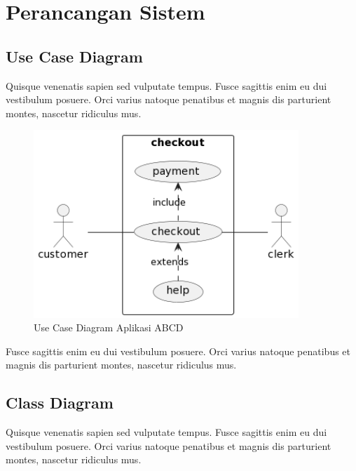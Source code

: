\section{Perancangan Sistem}

\subsection{Use Case Diagram}
Quisque venenatis sapien sed vulputate tempus. Fusce sagittis enim eu dui vestibulum posuere. Orci varius natoque penatibus et magnis dis parturient montes, nascetur ridiculus mus.
\begin{figure}[H]
    \centering
    \includegraphics[width=10cm]{assets/pics/dummy-use-case-diagram.png}
    \caption{Use Case Diagram Aplikasi ABCD}
    \label{fig:usecaseDiagram}
\end{figure}

Fusce sagittis enim eu dui vestibulum posuere. Orci varius natoque penatibus et magnis dis parturient montes, nascetur ridiculus mus.

\subsection{Class Diagram}
Quisque venenatis sapien sed vulputate tempus. Fusce sagittis enim eu dui vestibulum posuere. Orci varius natoque penatibus et magnis dis parturient montes, nascetur ridiculus mus.


